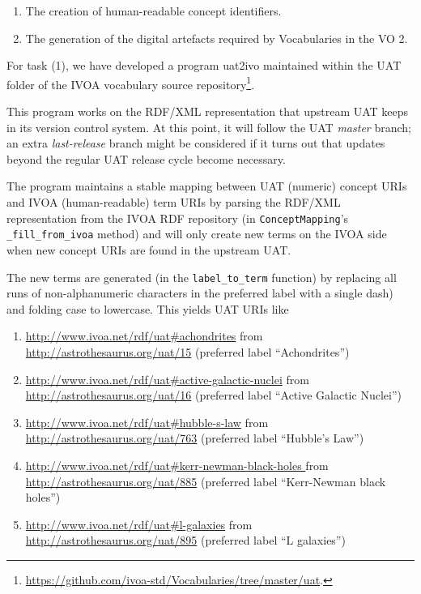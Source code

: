\documentclass[11pt,a4paper]{ivoa}
\begin{document}
\begin{enumerate}
\item The creation of human-readable concept identifiers.
\item The generation of the digital artefacts required by Vocabularies
in the VO 2.
\end{enumerate}

For task (1), we have developed a program uat2ivo maintained within
the UAT folder of the IVOA vocabulary source 
repository\footnote{\url{https://github.com/ivoa-std/Vocabularies/tree/master/uat}.}.

This program works on the RDF/XML representation that upstream UAT
keeps in its version control system.  At this point, it will follow the
UAT \emph{master} branch; an extra \emph{last-release} branch might be
considered if it turns out that updates beyond the regular UAT release
cycle become necessary.

The program maintains a stable mapping between UAT (numeric) concept
URIs and IVOA (human-readable) term URIs by parsing the RDF/XML
representation from the IVOA RDF repository (in \verb|ConceptMapping|'s
\verb|_fill_from_ivoa| method) and will only create new terms on the
IVOA side when new concept URIs are found in the upstream UAT.

The new terms are generated (in the \verb|label_to_term| function) by
replacing all runs of non-alphanumeric characters in the preferred label
with a single dash) and folding case to lowercase.  This yields UAT URIs
like

\begin{enumerate}
\raggedright
\item \url{http://www.ivoa.net/rdf/uat#achondrites} from
\url{http://astrothesaurus.org/uat/15} (preferred label ``Achondrites'')
\item \url{http://www.ivoa.net/rdf/uat#active-galactic-nuclei}
from \url{http://astrothesaurus.org/uat/16} (preferred label ``Active
Galactic Nuclei'')
\item \url{http://www.ivoa.net/rdf/uat#hubble-s-law}
from \url{http://astrothesaurus.org/uat/763} (preferred label ``Hubble's
Law'')
\item \url{http://www.ivoa.net/rdf/uat#kerr-newman-black-holes }
from \url{http://astrothesaurus.org/uat/885} (preferred label
``Kerr-Newman black holes'')
\item \url{http://www.ivoa.net/rdf/uat#l-galaxies} from
\url{http://astrothesaurus.org/uat/895} (preferred label ``L galaxies'')
\end{enumerate}
\end{document}
